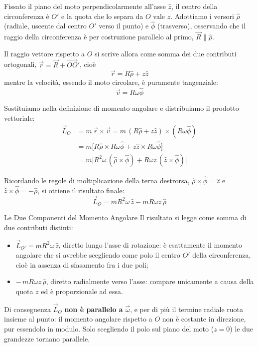 Fissato il piano del moto perpendicolarmente all'asse $\hat{z}$, il centro della circonferenza è $O'$ e la quota che lo separa da $O$ vale $z$. Adottiamo i versori $\hat{\rho}$ (radiale, uscente dal centro $O'$ verso il punto) e $\hat{\phi}$ (trasverso), osservando che il raggio della circonferenza è per costruzione parallelo al primo, $\vec{R} \parallel \hat{\rho}$.

Il raggio vettore rispetto a $O$ si scrive allora come somma dei due contributi ortogonali, $\vec{r} = \vec{R} + \vec{OO}'$, cioè
\begin{equation}
    \vec{r} = R\hat{\rho} + z\hat{z}
\end{equation}
mentre la velocità, essendo il moto circolare, è puramente tangenziale:
\begin{equation}
    \vec{v} = R\omega\hat{\phi}
\end{equation}

Sostituiamo nella definizione di momento angolare e distribuiamo il prodotto vettoriale:
\begin{align}
    \vec{L}_O &= m \, \vec{r} \times \vec{v} = m \, (R \hat{\rho} + z \hat{z}) \times (R \omega \hat{\phi}) \\
              &= m \big[ R \hat{\rho} \times R \omega \hat{\phi} + z \hat{z} \times R \omega \hat{\phi} \big] \\
              &= m \big[ R^2 \omega \, (\hat{\rho} \times \hat{\phi}) + R \omega z \, (\hat{z} \times \hat{\phi}) \big]
\end{align}

Ricordando le regole di moltiplicazione della terna destrorsa, $\hat{\rho} \times \hat{\phi} = \hat{z}$ e $\hat{z} \times \hat{\phi} = -\hat{\rho}$, si ottiene il risultato finale:
\begin{equation}
    \vec{L}_O = m R^2 \omega \, \hat{z} - m R \omega z \, \hat{\rho}
\end{equation}

\begin{osservazione}{Le Due Componenti del Momento Angolare}
Il risultato si legge come somma di due contributi distinti:
\begin{itemize}[leftmargin=1.4em]
    \item $\vec{L}_{O'} = m R^2 \omega \, \hat{z}$, diretto lungo l'asse di rotazione: è esattamente il momento angolare che si avrebbe scegliendo come polo il centro $O'$ della circonferenza, cioè in assenza di sfasamento fra i due poli;
    \item $-\, m R \omega z \, \hat{\rho}$, diretto radialmente verso l'asse: compare unicamente a causa della quota $z$ ed è proporzionale ad essa.
\end{itemize}
Di conseguenza $\vec{L}_O$ \textbf{non è parallelo a} $\vec{\omega}$, e per di più il termine radiale ruota insieme al punto: il momento angolare rispetto a $O$ non è costante in direzione, pur essendolo in modulo. Solo scegliendo il polo sul piano del moto ($z = 0$) le due grandezze tornano parallele.
\end{osservazione}

